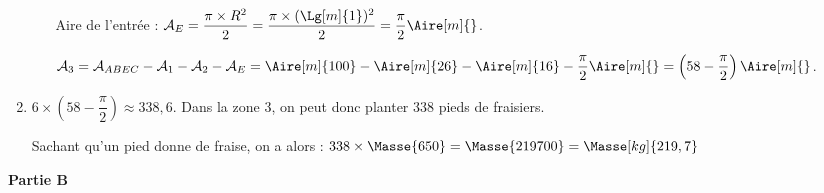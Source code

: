 \begin{enumerate}
\begin{enumerate}
            Aire de l'entrée : $\mathcal{A}_E =\dfrac{\pi\times R^2}{2} =\dfrac{\pi\times(\Lg[m]{1})^2}{2} =\dfrac{\pi}{2}\Aire[m]{}$. \par
            $\mathcal{A}_3 =\mathcal{A}_{ABEC}-\mathcal{A}_1-\mathcal{A}_2-\mathcal{A}_E =\Aire[m]{100}-\Aire[m]{26}-\Aire[m]{16}-\dfrac{\pi}{2}\Aire[m]{} =\left(58-\dfrac{\pi}{2}\right)\Aire[m]{}$. \par
      \end{enumerate}
   \item $6\times\left(58-\dfrac{\pi}{2}\right) \approx338,6$. Dans la zone 3, on peut donc planter 338 pieds de fraisiers. \par
      Sachant qu'un pied donne  de fraise, on a alors : $338\times\Masse{650} =\Masse{219700} =\Masse[kg]{219,7}$ \par
\end{enumerate}

{\bf Partie B}

